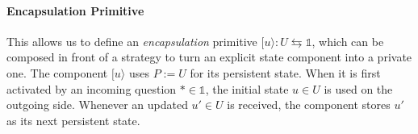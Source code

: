 \documentclass[acmsmall,nonacm]{acmart}
\newcommand{\kw}[1]{\ensuremath{ \mathsf{#1} }}
\newcommand{\lensarrow}{\leftrightarrows}
\newcommand{\mathbbm}[1]{\mathds{#1}}
\begin{document}
%

\paragraph{Encapsulation Primitive} %

This allows us to define an \emph{encapsulation} primitive
$[ u \rangle : U \lensarrow \mathbbm{1}$,
which can be composed in front of a strategy
to turn an explicit state component into a private one.
The component $[u\rangle$ uses $P := U$ for its persistent state.
When it is first activated
by an incoming question $* \in \mathbbm{1}$,
the initial state $u \in U$ is used on the outgoing side.
Whenever an updated $u' \in U$ is received,
the component stores $u'$ as its next persistent state.



\end{document}
